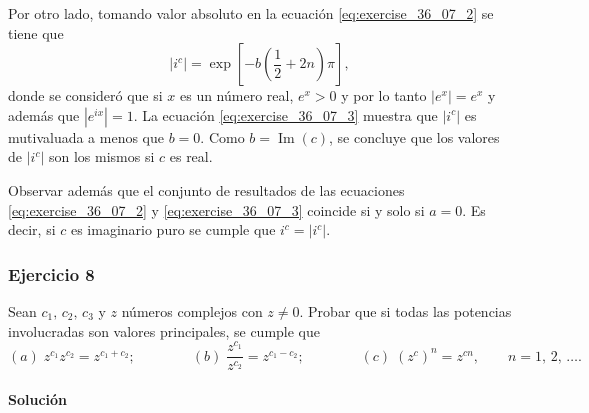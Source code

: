 \documentclass[a4paper]{report}
\renewcommand{\Im}{\operatorname{Im}}
\begin{document}
Por otro lado, tomando valor absoluto en la ecuación \ref{eq:exercise_36_07_2} se tiene que
\begin{equation}\label{eq:exercise_36_07_3}
 |i^c|=\exp\left[-b\left(\frac{1}{2}+2n\right)\pi\right], 
\end{equation}
donde se consideró que si \(x\) es un número real, \(e^x>0\) y por lo tanto \(|e^x|=e^x\) y además que \(|e^{ix}|=1\). La ecuación \ref{eq:exercise_36_07_3} muestra que \(|i^c|\) es mutivaluada a menos que \(b=0\). Como \(b=\Im(c)\), se concluye que los valores de \(|i^c|\) son  los mismos si \(c\) es real.

Observar además que el conjunto de resultados de las ecuaciones \ref{eq:exercise_36_07_2} y \ref{eq:exercise_36_07_3} coincide si y solo si \(a=0\). Es decir, si \(c\) es imaginario puro se cumple que \(i^c=|i^c|\).

\subsubsection{Ejercicio 8}

Sean \(c_1,\,c_2,\,c_3\) y \(z\) números complejos con \(z\neq0\). Probar que si todas las potencias involucradas son valores principales, se cumple que 
\[
 (\textit{a})\;z^{c_1}z^{c_2}=z^{c_1+c_2};\qquad\qquad 
 (\textit{b})\;\frac{z^{c_1}}{z^{c_2}}=z^{c_1-c_2};\qquad\qquad
 (\textit{c})\;(z^c)^n=z^{cn},\qquad n=1,\,2,\,\dots.
\]

\paragraph{Solución} 
\end{document}
